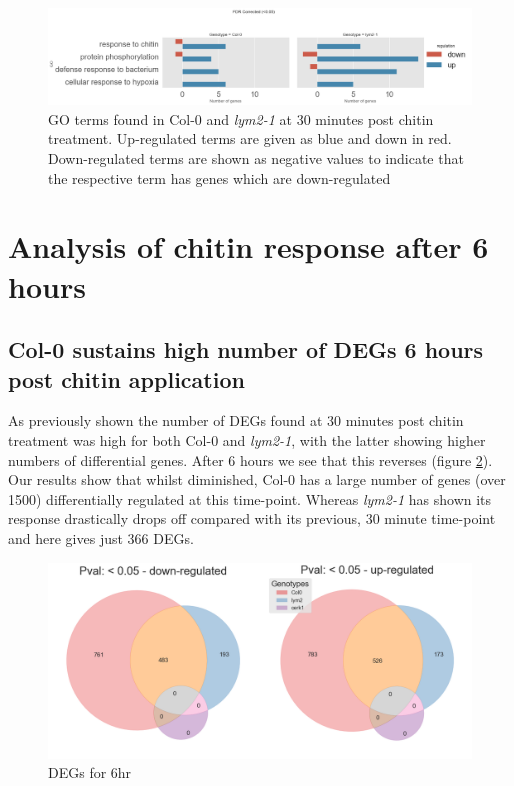 \documentclass[../main.tex]{subfiles}
\begin{document}
\begin{figure}[ht]
  \centering
  \includegraphics[width=\columnwidth]{figures/05hrGO.png}
  \caption{\label{fig:05hrGO} GO terms found in Col-0 and \textit{lym2-1} at 30
    minutes post chitin treatment. Up-regulated terms are given as blue and down
  in red. Down-regulated terms are shown as negative values to indicate that the
  respective term has genes which are down-regulated}
\end{figure}


\clearpage

\section{Analysis of chitin response after 6 hours}

\subsection{Col-0 sustains high number of DEGs 6 hours post chitin application}
\label{sec:col-0-sustains}

As previously shown the number of DEGs found at 30 minutes post chitin treatment
was high for both Col-0 and \textit{lym2-1}, with the latter showing higher
numbers of differential genes. After 6 hours we see that this reverses (figure
\ref{fig:6hrDEGs}). Our results show that whilst diminished, Col-0 has a large
number of genes (over 1500) differentially regulated at this time-point. Whereas
\textit{lym2-1} has shown its response drastically drops off compared with its
previous, 30 minute time-point and here gives just 366 DEGs. 


\begin{figure}[ht]
  \centering
  \includegraphics[width=0.8\columnwidth]{figures/vennTreatmentschitin6.png}
  \caption{\label{fig:6hrDEGs} DEGs for 6hr}
\end{figure}
\end{document}
